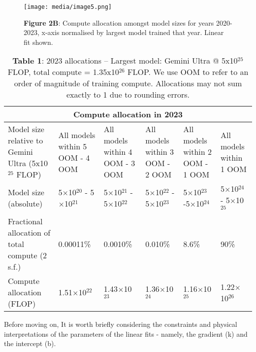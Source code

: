 \documentclass[11pt]{article}
\begin{document}
\begin{figure}[h]
\centering
\texttt{[image: media/image5.png]}
\caption*{\textbf{Figure 2B}: Compute allocation amongst model sizes for years 2020-2023, x-axis normalised by largest model trained that year. Linear fit shown.}
\label{figure-2b-compute-allocation-amongst-model-sizes-for-years-2020-2023-x-axis-normalised-by-largest-model-trained-that-year.-linear-fit-shown.}
\end{figure}

\begin{table}[h]
\centering
\caption*{\textbf{Table 1}: 2023 allocations -- Largest model: Gemini Ultra @ 5x10$^{25}$ FLOP, total compute = 1.35x10$^{26}$ FLOP. We use OOM to refer to an order of magnitude of training compute. Allocations may not sum exactly to 1 due to rounding errors.}
\label{table-1-2023-allocations-largest-model-gemini-ultra-5x1025-flop-total-compute-1.35x1026-flop.-we-use-oom-to-refer-to-an-order-of-magnitude-of-training-compute.-allocations-may-not-sum-exactly-to-1-due-to-rounding-errors.}
\begin{tabular}{|p{2cm}|p{2cm}|p{2cm}|p{2cm}|p{2cm}|p{2cm}|}
\hline
\multicolumn{6}{|c|}{\textbf{Compute allocation in 2023}} \\
\hline
Model size relative to Gemini Ultra (5x10$^{25}$ FLOP) & All models within 5 OOM - 4 OOM & All models within 4 OOM - 3 OOM & All models within 3 OOM - 2 OOM & All models within 2 OOM - 1 OOM & All models within 1 OOM \\
\hline
Model size (absolute) & 5$\times$10$^{20}$ - 5$\times$10$^{21}$ & 5$\times$10$^{21}$ - 5$\times$10$^{22}$ & 5$\times$10$^{22}$ - 5$\times$10$^{23}$ & 5$\times$10$^{23}$-5$\times$10$^{24}$ & 5$\times$10$^{24}$ - 5$\times$10$^{25}$ \\
\hline
Fractional allocation of total compute (2 s.f.) & 0.00011\% & 0.0010\% & 0.010\% & 8.6\% & 90\% \\
\hline
Compute allocation (FLOP) & 1.51$\times$10$^{22}$ & 1.43$\times$10$^{23}$ & 1.36$\times$10$^{24}$ & 1.16$\times$10$^{25}$ & 1.22$\times$10$^{26}$ \\
\hline
\end{tabular}
\end{table}

Before moving on, It is worth briefly considering the constraints and physical interpretations of the parameters of the linear fits - namely, the gradient (k) and the intercept (b).
\end{document}
